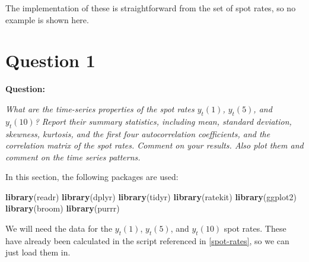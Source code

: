 \documentclass[]{book}
\newenvironment{Shaded}{\begin{snugshade}}{\end{snugshade}}
\newcommand{\KeywordTok}[1]{\textcolor[rgb]{0.13,0.29,0.53}{\textbf{#1}}}
\newcommand{\NormalTok}[1]{#1}
\newcommand{\OperatorTok}[1]{\textcolor[rgb]{0.81,0.36,0.00}{\textbf{#1}}}
\newcommand{\StringTok}[1]{\textcolor[rgb]{0.31,0.60,0.02}{#1}}
\theoremstyle{definition}
\theoremstyle{definition}
\theoremstyle{definition}
\theoremstyle{remark}
\begin{document}
The implementation of these is straightforward from the set of spot
rates, so no example is shown here.

\hypertarget{q1}{%
\chapter{Question 1}\label{q1}}

\textbf{Question:}

\emph{What are the time-series properties of the spot rates \(y_t(1)\),
\(y_t(5)\), and \(y_t(10)\)? Report their summary statistics, including
mean, standard deviation, skewness, kurtosis, and the first four
autocorrelation coefficients, and the correlation matrix of the spot
rates. Comment on your results. Also plot them and comment on the time
series patterns.}

In this section, the following packages are used:

\begin{Shaded}
\begin{Highlighting}[]
\KeywordTok{library}\NormalTok{(readr)}
\KeywordTok{library}\NormalTok{(dplyr)}
\KeywordTok{library}\NormalTok{(tidyr)}
\KeywordTok{library}\NormalTok{(ratekit)}
\KeywordTok{library}\NormalTok{(ggplot2)}
\KeywordTok{library}\NormalTok{(broom)}
\KeywordTok{library}\NormalTok{(purrr)}
\end{Highlighting}
\end{Shaded}

We will need the data for the \(y_t(1)\), \(y_t(5)\), and \(y_t(10)\)
spot rates. These have already been calculated in the script referenced
in \ref{spot-rates}, so we can just load them in.

\begin{Shaded}
\end{Shaded}
\end{document}
